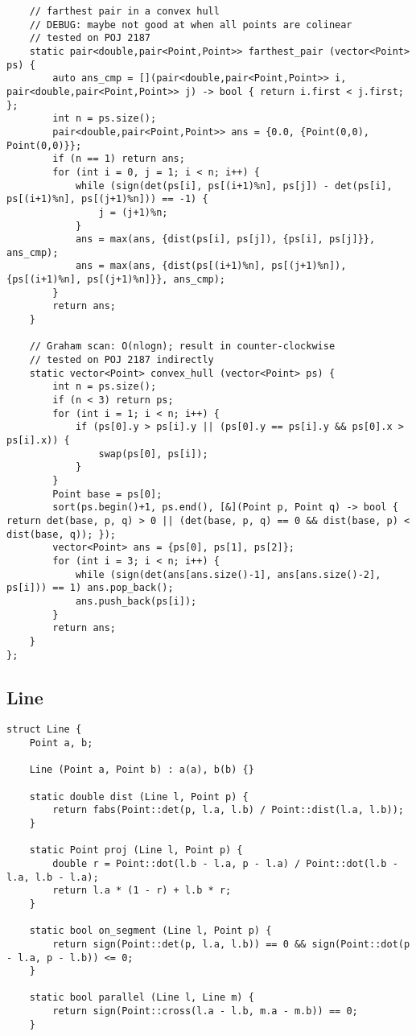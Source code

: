 \documentclass[10pt,landscape]{article}
\begin{document}
\begin{multicols}{2}
\begin{lstlisting}
	// farthest pair in a convex hull
	// DEBUG: maybe not good at when all points are colinear
	// tested on POJ 2187
	static pair<double,pair<Point,Point>> farthest_pair (vector<Point> ps) {
		auto ans_cmp = [](pair<double,pair<Point,Point>> i, pair<double,pair<Point,Point>> j) -> bool { return i.first < j.first; };
		int n = ps.size();
		pair<double,pair<Point,Point>> ans = {0.0, {Point(0,0), Point(0,0)}};
		if (n == 1) return ans;
		for (int i = 0, j = 1; i < n; i++) {
			while (sign(det(ps[i], ps[(i+1)%n], ps[j]) - det(ps[i], ps[(i+1)%n], ps[(j+1)%n])) == -1) {
				j = (j+1)%n;
			}
			ans = max(ans, {dist(ps[i], ps[j]), {ps[i], ps[j]}}, ans_cmp);
			ans = max(ans, {dist(ps[(i+1)%n], ps[(j+1)%n]), {ps[(i+1)%n], ps[(j+1)%n]}}, ans_cmp);
		}
		return ans;
	}

	// Graham scan: O(nlogn); result in counter-clockwise
	// tested on POJ 2187 indirectly
	static vector<Point> convex_hull (vector<Point> ps) {
		int n = ps.size();
		if (n < 3) return ps;
		for (int i = 1; i < n; i++) {
			if (ps[0].y > ps[i].y || (ps[0].y == ps[i].y && ps[0].x > ps[i].x)) {
				swap(ps[0], ps[i]);
			}
		}
		Point base = ps[0];
		sort(ps.begin()+1, ps.end(), [&](Point p, Point q) -> bool { return det(base, p, q) > 0 || (det(base, p, q) == 0 && dist(base, p) < dist(base, q)); });
		vector<Point> ans = {ps[0], ps[1], ps[2]};
		for (int i = 3; i < n; i++) {
			while (sign(det(ans[ans.size()-1], ans[ans.size()-2], ps[i])) == 1) ans.pop_back();
			ans.push_back(ps[i]);
		}
		return ans;
	}
};
\end{lstlisting}
\subsection{Line}
\begin{lstlisting}
struct Line {
	Point a, b;

	Line (Point a, Point b) : a(a), b(b) {}

	static double dist (Line l, Point p) {
		return fabs(Point::det(p, l.a, l.b) / Point::dist(l.a, l.b));
	}

	static Point proj (Line l, Point p) {
		double r = Point::dot(l.b - l.a, p - l.a) / Point::dot(l.b - l.a, l.b - l.a);
		return l.a * (1 - r) + l.b * r;
	}

	static bool on_segment (Line l, Point p) {
		return sign(Point::det(p, l.a, l.b)) == 0 && sign(Point::dot(p - l.a, p - l.b)) <= 0;
	}

	static bool parallel (Line l, Line m) {
		return sign(Point::cross(l.a - l.b, m.a - m.b)) == 0;
	}


\end{lstlisting}
\end{multicols}
\end{document}
